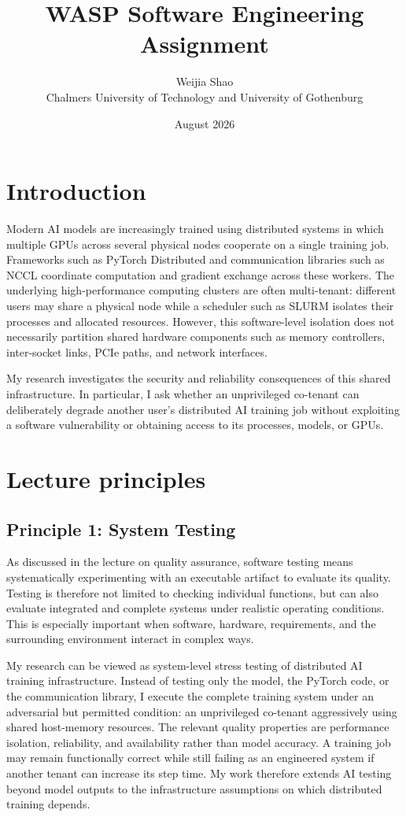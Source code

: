 \documentclass{article}
\title{WASP Software Engineering Assignment}
\author{
    Weijia Shao \\
    Chalmers University of Technology and University of Gothenburg
}
\date{August 2026}
\begin{document}
\maketitle

\section{Introduction}
Modern AI models are increasingly trained using distributed systems in which
multiple GPUs across several physical nodes cooperate on a single training
job. Frameworks such as PyTorch Distributed and communication libraries such
as NCCL coordinate computation and gradient exchange across these workers.
The underlying high-performance computing clusters are often multi-tenant:
different users may share a physical node while a scheduler such as SLURM
isolates their processes and allocated resources. However, this software-level
isolation does not necessarily partition shared hardware components such as
memory controllers, inter-socket links, PCIe paths, and network interfaces.

My research investigates the security and reliability consequences of this
shared infrastructure. In particular, I ask whether an unprivileged co-tenant
can deliberately degrade another user's distributed AI training job without
exploiting a software vulnerability or obtaining access to its processes,
models, or GPUs.


\section{Lecture principles}
\subsection{Principle 1: System Testing}
As discussed in the lecture on quality assurance, software testing means
systematically experimenting with an executable artifact to evaluate its
quality. Testing is therefore not limited to checking individual functions,
but can also evaluate integrated and complete systems under realistic
operating conditions. This is especially important when software, hardware,
requirements, and the surrounding environment interact in complex ways.

My research can be viewed as system-level stress testing of distributed AI
training infrastructure. Instead of testing only the model, the PyTorch code,
or the communication library, I execute the complete training system under an
adversarial but permitted condition: an unprivileged co-tenant aggressively
using shared host-memory resources. The relevant quality properties are
performance isolation, reliability, and availability rather than model
accuracy. A training job may remain functionally correct while still failing
as an engineered system if another tenant can increase its step time. My work
therefore extends AI testing beyond model outputs to the infrastructure
assumptions on which distributed training depends.
\end{document}
